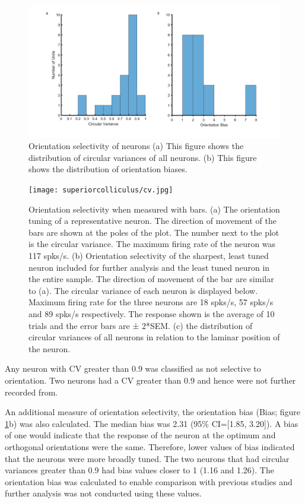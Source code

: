 	\begin{figure}[]
	
	\includegraphics[width=\linewidth]{superiorcolliculus/orituning_fig.jpg}
	\caption{Orientation selectivity of neurons (a) This
		figure shows the distribution of circular variances of all neurons. (b)
		This figure shows the distribution of orientation biases.}
	\label{fig:orihist}
\end{figure}


\begin{figure}[]
	\texttt{[image: superiorcolliculus/cv.jpg]}
	\caption{Orientation selectivity when measured with bars. (a) The
		orientation tuning of a representative neuron. The direction of movement
		of the bars are shown at the poles of the plot. The number next to the
		plot is the circular variance. The maximum firing rate of the neuron was
		117 spks/s. (b) Orientation selectivity of the sharpest, least tuned
		neuron included for further analysis and the least tuned neuron in the
		entire sample. The direction of movement of the bar are similar to (a).
		The circular variance of each neuron is displayed below. Maximum firing
		rate for the three neurons are 18 spks/s, 57 spks/s and 89 spks/s
		respectively. The response shown is the average of 10 trials and the
		error bars are ± 2*SEM. (c) the distribution of circular variances of
		all neurons in relation to the laminar position of the neuron.}
	\label{fig:range}			
\end{figure}

Any neuron with CV greater than 0.9 was classified as not selective to
orientation. Two neurons had a CV greater than 0.9 and hence were not
further recorded from.

An additional measure of orientation selectivity, the orientation bias
(Bias; figure \ref{fig:orihist}b) was also calculated. The median bias was 2.31 (95\%
CI={[}1.85, 3.20{]}). A bias of one would indicate that the response of
the neuron at the optimum and orthogonal orientations were the same.
Therefore, lower values of bias indicated that the neurons were more
broadly tuned. The two neurons that had circular variances greater than
0.9 had bias values closer to 1 (1.16 and 1.26). The orientation bias
was calculated to enable comparison with previous studies and further
analysis was not conducted using these values.

